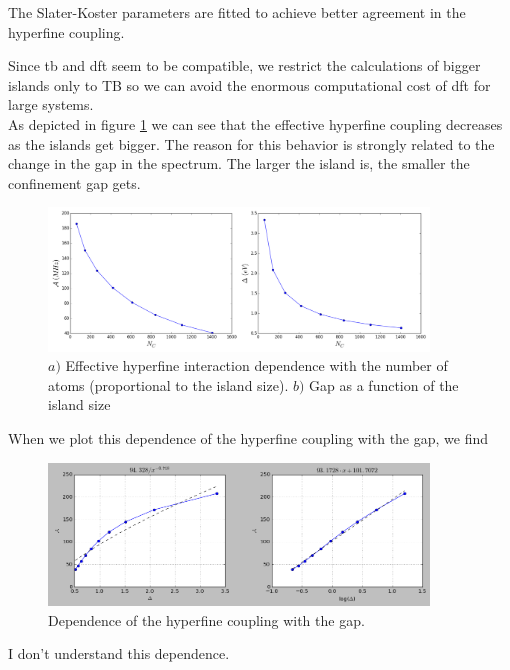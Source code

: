 The Slater-Koster parameters are fitted to achieve better agreement in the hyperfine coupling.

Since \ac{tb} and \ac{dft} seem to be compatible, we restrict the calculations of bigger islands only to TB so we can avoid the enormous computational cost of \ac{dft} for large systems.\\

As depicted in figure \ref{hyper} we can see that the effective hyperfine coupling decreases as the islands get bigger. The reason for this behavior is strongly related to the change in the gap in the spectrum. The larger the island is, the smaller the confinement gap gets.
\begin{figure}
\centering
\includegraphics[width=0.9\textwidth]{chapter05/figures/hypergap.png}
\caption{$a)$ Effective hyperfine interaction dependence with the number of atoms (proportional to the island size). $b)$ Gap as a function of the island size}
\label{hyper}
\end{figure}
\FloatBarrier





When we plot this dependence of the hyperfine coupling with the gap, we find
\begin{figure}[h!]
\centering
\includegraphics[width=0.9\textwidth]{chapter05/figures/A_gap.png}
\vspace{-5pt}
\caption{Dependence of the hyperfine coupling with the gap.}
\end{figure}
\FloatBarrier
I don't understand this dependence.

